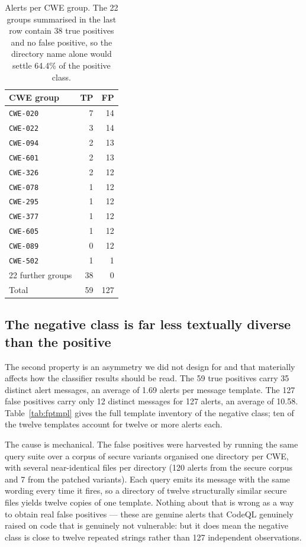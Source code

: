 \documentclass[journal]{IEEEtran}
\theoremstyle{definition}
\newcommand{\RNtp}{59}
\newcommand{\RNfp}{127}
\newcommand{\CMsgTp}{35}
\newcommand{\CMsgFp}{12}
\newcommand{\CMultTp}{1.69}
\newcommand{\CMultFp}{10.58}
\newcommand{\CFpSecure}{120}
\newcommand{\CFpPatched}{7}
\newcommand{\DCweOnlyTp}{22}
\newcommand{\DTpOnOnly}{38}
\newcommand{\DTpOnOnlyPct}{64.4}
\begin{document}
\begin{table}[t]
\centering
\caption{Alerts per CWE group. The \DCweOnlyTp{} groups summarised in the last
row contain \DTpOnOnly{} true positives and no false positive, so the directory
name alone would settle \DTpOnOnlyPct\% of the positive class.}
\label{tab:cwe}
\footnotesize
\setlength{\tabcolsep}{6pt}
\begin{tabular}{@{}lrr@{}}
\toprule
CWE group & TP & FP \\
\midrule
\texttt{CWE-020} & 7 & 14 \\
\texttt{CWE-022} & 3 & 14 \\
\texttt{CWE-094} & 2 & 13 \\
\texttt{CWE-601} & 2 & 13 \\
\texttt{CWE-326} & 2 & 12 \\
\texttt{CWE-078} & 1 & 12 \\
\texttt{CWE-295} & 1 & 12 \\
\texttt{CWE-377} & 1 & 12 \\
\texttt{CWE-605} & 1 & 12 \\
\texttt{CWE-089} & 0 & 12 \\
\texttt{CWE-502} & 1 & 1 \\
\midrule
22 further groups & 38 & 0 \\
\midrule
Total & \RNtp & \RNfp \\
\bottomrule
\end{tabular}
\end{table}

\subsection{The negative class is far less textually diverse than the positive}
\label{sec:diversity}

The second property is an asymmetry we did not design for and that materially
affects how the classifier results should be read. The \RNtp{} true positives
carry \CMsgTp{} distinct alert messages, an average of \CMultTp{} alerts per
message template. The \RNfp{} false positives carry only \CMsgFp{} distinct
messages for \RNfp{} alerts, an average of \CMultFp{}. Table~\ref{tab:fptmpl}
gives the full template inventory of the negative class; ten of the twelve
templates account for twelve or more alerts each.

The cause is mechanical. The false positives were harvested by running the same
query suite over a corpus of secure variants organised one directory per CWE,
with several near-identical files per directory
(\CFpSecure{} alerts from the secure corpus and \CFpPatched{} from the patched
variants). Each query emits its message with the same wording every time it
fires, so a directory of twelve structurally similar secure files yields twelve
copies of one template. Nothing about that is wrong as a way to obtain real
false positives --- these are genuine alerts that CodeQL genuinely raised on
code that is genuinely not vulnerable: but it does mean the negative class is
close to twelve repeated strings rather than \RNfp{} independent observations.
\end{document}
